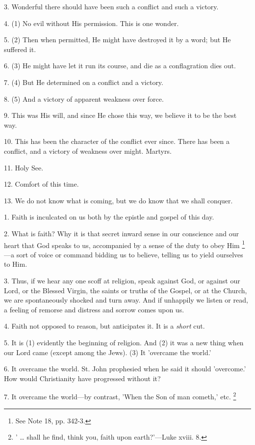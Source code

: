 3. Wonderful there should have been such a
conflict and such a victory.

4. (1) No evil without His permission. This is
one wonder.

5. (2) Then when permitted, He might have
destroyed it by a word; but He suffered it.

6. (3) He might have let it run its course, and
die as a conflagration dies out.

7. (4) But He determined on a conflict and a
victory.

8. (5) And a victory of apparent weakness over
force.

9. This was His will, and since He chose this
way, we believe it to be the best way.

10. This has been the character of the conflict
ever since. There has been a conflict, and a victory of weakness over
might. Martyrs.

11. Holy See.

12. Comfort of this time.

13. We do not know what is coming, but we do know
that we shall conquer.


1. Faith is inculcated on us both by the epistle
and gospel of this day.

2. What is faith? Why it is that secret inward
sense in our conscience and our heart that God speaks to us,
accompanied by a sense of the duty to obey Him \footnote{See Note
18, pp. 342-3.}—a sort of voice or command bidding us to believe, telling us
to yield ourselves to Him.

3. Thus, if we hear any one scoff at religion,
speak against God, or against our Lord, or the Blessed Virgin, the
saints or truths of the Gospel, or at the Church, we are spontaneously
shocked and turn away. And if unhappily we listen or read, a feeling
of remorse and distress and sorrow comes upon us.

4. Faith not opposed to reason, but anticipates
it. It is a \emph{short} cut.

5. It is (1) evidently the beginning of religion.
And (2) it was a new thing when our Lord came (except among the Jews).
(3) It 'overcame the world.'

6. It overcame the world. St. John prophesied
when he said it should 'overcome.' How would Christianity have
progressed without it?

7. It overcame the world—by contrast, 'When the
Son of man cometh,' etc. \footnote{' … shall he find, think
you, faith upon earth?'—Luke xviii. 8.}

